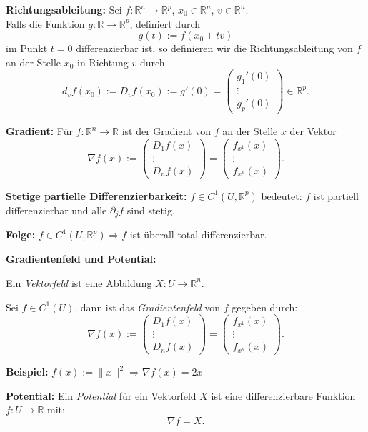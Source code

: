 \textbf{Richtungsableitung:} Sei $f : \mathbb{R}^n \to \mathbb{R}^p$, $x_0 \in \mathbb{R}^n$, $v \in \mathbb{R}^n$.\\
Falls die Funktion $g : \mathbb{R} \to \mathbb{R}^p$, definiert durch
\[
g(t) := f(x_0 + tv)
\]
im Punkt $t=0$ differenzierbar ist, so definieren wir die Richtungsableitung von $f$ an der Stelle $x_0$ in Richtung $v$ durch
\[
d_v f(x_0) := D_v f(x_0) := g'(0) = 
\begin{pmatrix}
g_1'(0) \\
\vdots \\
g_p'(0)
\end{pmatrix}
\in \mathbb{R}^p.
\]

\textbf{Gradient:} Für $f : \mathbb{R}^n \to \mathbb{R}$ ist der Gradient von $f$ an der Stelle $x$ der Vektor
\[
\nabla f(x) := 
\begin{pmatrix}
D_1 f(x) \\
\vdots \\
D_n f(x)
\end{pmatrix}
=
\begin{pmatrix}
f_{x^1}(x) \\
\vdots \\
f_{x^n}(x)
\end{pmatrix}.
\]

\textbf{Stetige partielle Differenzierbarkeit:}
$f \in C^1(U, \mathbb{R}^p)$ bedeutet: $f$ ist partiell differenzierbar und alle $\partial_j f$ sind stetig.

\textbf{Folge:} $f \in C^1(U, \mathbb{R}^p) \Rightarrow f$ ist überall total differenzierbar.

\textbf{Gradientenfeld und Potential:}

Ein \emph{Vektorfeld} ist eine Abbildung \( X : U \to \mathbb{R}^n \).

Sei \( f \in C^1(U) \), dann ist das \emph{Gradientenfeld} von \( f \) gegeben durch:
\[
\nabla f(x) := 
\begin{pmatrix}
D_1 f(x) \\
\vdots \\
D_n f(x)
\end{pmatrix}
= 
\begin{pmatrix}
f_{x^1}(x) \\
\vdots \\
f_{x^n}(x)
\end{pmatrix}
.
\]

\textbf{Beispiel:} \( f(x) := \|x\|^2 \Rightarrow \nabla f(x) = 2x \)

\textbf{Potential:} Ein \emph{Potential} für ein Vektorfeld \( X \) ist eine differenzierbare Funktion \( f : U \to \mathbb{R} \) mit:
\[
\nabla f = X.
\]

